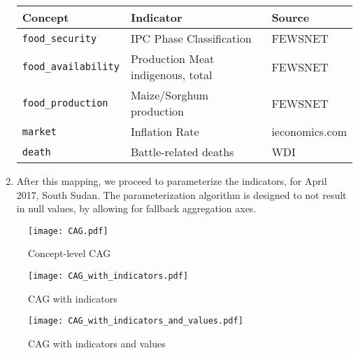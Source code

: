 \documentclass{apnotes}
\begin{document}
\begin{enumerate}
  {\centering
  \begin{tabular}{lll}
    \toprule
    Concept                     & Indicator                         & Source\\
    \midrule
    \texttt{food\_security}     & IPC Phase Classification          & FEWSNET\\
    \texttt{food\_availability} & Production Meat indigenous, total & FEWSNET\\
    \texttt{food\_production}   & Maize/Sorghum  production         & FEWSNET\\
    \texttt{market}             & Inflation Rate                    & ieconomics.com\\
    \texttt{death}              & Battle-related deaths             & WDI\\
    \bottomrule
  \end{tabular}
  }

\item After this mapping, we proceed to parameterize the indicators, for April
  2017, South Sudan. The parameterization algorithm is designed to not result in
  null values, by allowing for fallback aggregation axes.
\end{enumerate}

\begin{figure}
  \centering
  \texttt{[image: CAG.pdf]}
  \caption{Concept-level CAG}
  \label{fig:precipitation_centered_cag}
\end{figure}

\begin{figure}
  \centering
  \texttt{[image: CAG\_with\_indicators.pdf]}
  \caption{CAG with indicators}
\end{figure}

\begin{figure}
  \centering
  \texttt{[image: CAG\_with\_indicators\_and\_values.pdf]}
  \caption{CAG with indicators and values}
\end{figure}
\end{document}
